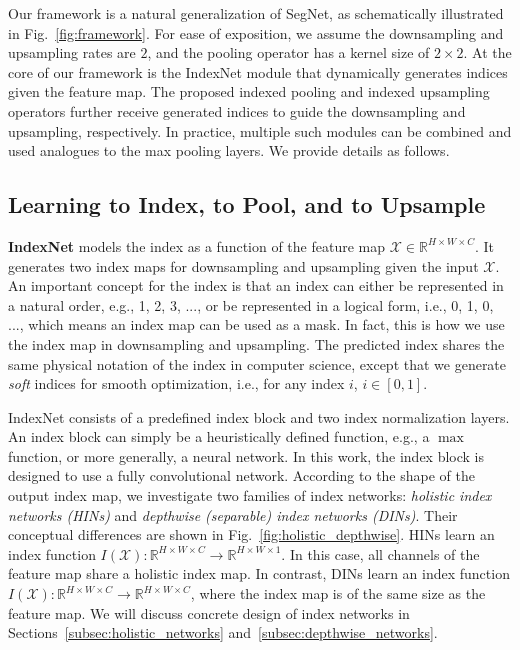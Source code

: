 \documentclass[10pt,twocolumn,letterpaper]{article}
\begin{document}
Our framework is a natural generalization of SegNet, as schematically illustrated in Fig.~\ref{fig:framework}. For ease of exposition, we assume the downsampling and upsampling rates are $2$, and the pooling operator has a kernel size of $2\times2$. At the core of our framework is the IndexNet module that dynamically generates indices given the feature map. The proposed indexed pooling and indexed upsampling operators further receive generated indices to guide the downsampling and upsampling, respectively. In practice, multiple such modules can be combined and used analogues to the max pooling layers. We provide details as follows.

\subsection{Learning to Index, to Pool, and to Upsample}

\noindent\textbf{IndexNet} models the index as a function of the feature map $\mathcal{X}\in\mathbb{R}^{H\times W\times C}$. It generates two index maps for downsampling and upsampling given the input $\mathcal{X}$. An important concept for the index is that an index can either be represented in a natural order, e.g., 1, 2, 3, ..., or be represented in a logical form, i.e., 0, 1, 0, ..., which means an index map can be used as a mask. In fact, this is how we use the index map in downsampling and upsampling. The predicted index shares the same physical notation of the index in computer science, except that we generate \textit{soft} indices for smooth optimization, i.e., for any index $i$, $i\in[0,1]$.

IndexNet consists of a predefined index block and two index normalization layers. An index block can  simply be a heuristically defined function, e.g., a $\max$  function, or more generally, a neural network. In this work, the index block is designed to use a fully convolutional network. According to the shape of the output index map, we investigate two families of index networks: \textit{holistic index networks (HINs)} and \textit{depthwise (separable) index networks (DINs)}. Their conceptual differences are shown in Fig.~\ref{fig:holistic_depthwise}. HINs learn an index function $I(\mathcal{X}):\mathbb{R}^{H\times W\times C}\rightarrow\mathbb{R}^{H\times W\times1}$. In this case, all channels of the feature map share a holistic index map. In contrast, DINs learn an index function $I(\mathcal{X}):\mathbb{R}^{H\times W\times C}\rightarrow\mathbb{R}^{H\times W \times C}$, where the index map is of the same size as the feature map. We will discuss concrete design of index networks in Sections~\ref{subsec:holistic_networks} and~\ref{subsec:depthwise_networks}.
\end{document}
